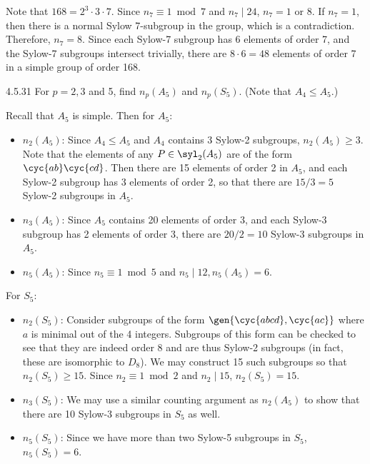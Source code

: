 \begin{sol}
	Note that $168 = 2^3 \cdot 3 \cdot 7$.
	Since $n_7 \equiv 1 \bmod 7$ and $n_7 \mid 24$, $n_7 = 1$ or $8$.
	If $n_7 = 1$, then there is a normal Sylow 7-subgroup in the group, which is a contradiction.
	Therefore, $n_7 = 8$.
	Since each Sylow-7 subgroup has 6 elements of order 7, and the Sylow-7 subgroups intersect trivially, there are $8 \cdot 6 = 48$ elements of order 7 in a simple group of order 168.
\end{sol}

\begin{exercise}{4.5.31}
	For $p = 2, 3$ and 5, find $n_p(A_5)$ and $n_p(S_5)$. (Note that $A_4 \leq A_5$.)
\end{exercise}

\begin{sol}
	Recall that $A_5$ is simple.
	Then for $A_5$:
	\begin{itemize}
		\item $n_2(A_5)$: Since $A_4 \leq A_5$ and $A_4$ contains 3 Sylow-2 subgroups, $n_2(A_5) \geq 3$.
	Note that the elements of any $P \in \syl_2(A_5)$ are of the form $\cyc{a b}\cyc{c d}$.
	Then there are 15 elements of order 2 in $A_5$, and each Sylow-2 subgroup has 3 elements of order 2, so that there are $15/3 = 5$ Sylow-2 subgroups in $A_5$.
		\item $n_3(A_5)$: Since $A_5$ contains 20 elements of order 3, and each Sylow-3 subgroup has 2 elements of order 3, there are $20/2 = 10$ Sylow-3 subgroups in $A_5$.
		\item $n_5(A_5)$: Since $n_5 \equiv 1 \bmod 5$ and $n_5 \mid 12, n_5(A_5) = 6$.
	\end{itemize}
	For $S_5$:
	\begin{itemize}
		\item $n_2(S_5)$: Consider subgroups of the form $\gen{\cyc{a b c d}, \cyc{a c}}$ where $a$ is minimal out of the 4 integers.
	Subgroups of this form can be checked to see that they are indeed order 8 and are thus Sylow-2 subgroups (in fact, these are isomorphic to $D_8$).
	We may construct 15 such subgroups so that $n_2(S_5) \geq 15$.
	Since $n_2 \equiv 1 \bmod 2$ and $n_2 \mid 15$, $n_2(S_5) = 15$.
		\item $n_3(S_5)$: We may use a similar counting argument as $n_2(A_5)$ to show that there are 10 Sylow-3 subgroups in $S_5$ as well.
		\item $n_5(S_5)$: Since we have more than two Sylow-5 subgroups in $S_5$, $n_5(S_5) = 6$.
	\end{itemize}	
\end{sol}

